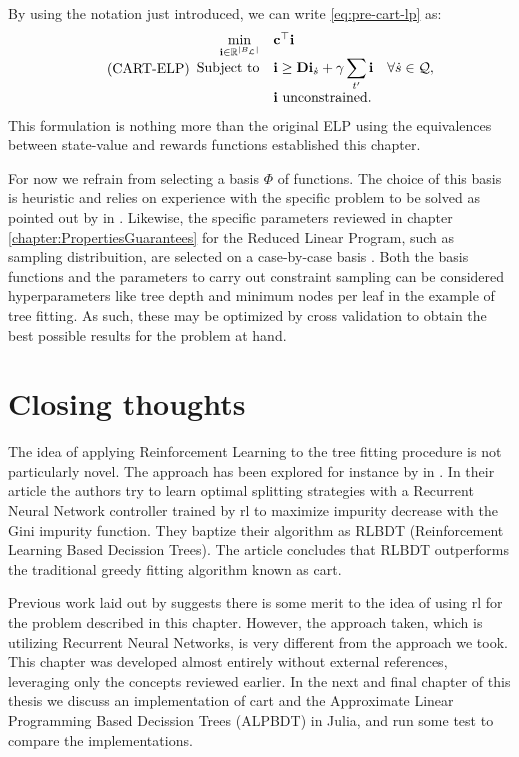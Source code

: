 By using the notation just introduced, we can write \eqref{eq:pre-cart-lp} as:
\begin{equation}
\tag{CART-ELP}
\label{lp:cart-elp}
\begin{array}{rl@{}ll}
    \displaystyle \min_{\vec{i} \in \R^{|B_\L|}} & \vec{c}^{\top} \vec{i} \\
    \text{Subject to} & \displaystyle \vec{i} \geq \vec{Di}_{\dot{s}} + \gamma \sum_{t'} \vec{i} & \quad \forall \dot{s} \in \mathcal{Q}, \\
    & \vec{i} \text{ unconstrained.} &
\end{array}
\end{equation}
This formulation is nothing more than the original ELP using the equivalences between state-value and rewards functions established this chapter.

For now we refrain from selecting a basis $\Phi$ of functions. The choice of
this basis is heuristic and relies on experience with the specific problem to be
solved as pointed out by \citeauthor{farias2003LP2ADP} in
\cite{farias2003LP2ADP}. Likewise, the specific parameters reviewed in chapter
\ref{chapter:PropertiesGuarantees} for the Reduced Linear Program, such as
sampling distribuition, are selected on a case-by-case basis
\cite{farias2004constraint}. Both the basis functions and the parameters to
carry out constraint sampling can be considered hyperparameters like tree depth
and minimum nodes per leaf in the example of tree fitting. As such, these may be
optimized by cross validation \cite[Ch.~2.1]{intro2statslearning} to obtain the
best possible results for the problem at hand.  

\section{Closing thoughts}

The idea of applying Reinforcement Learning to the tree fitting procedure is not
particularly novel. The approach has been explored for instance by
\citeauthor{xiong} in \cite{xiong}. In their article the authors try to learn
optimal splitting strategies with a Recurrent Neural Network controller trained
by \ac{rl} to maximize impurity decrease with the Gini impurity function. They
baptize their algorithm as RLBDT (Reinforcement Learning Based Decission Trees).
The article concludes that RLBDT outperforms the traditional greedy fitting
algorithm known as \ac{cart}.

Previous work laid out by \citeauthor{xiong} suggests there is some merit to the
idea of using \ac{rl} for the problem described in this chapter. However, the
approach taken, which is utilizing Recurrent Neural Networks, is very different
from the approach we took. This chapter was developed almost entirely without
external references, leveraging only the concepts reviewed earlier. In the next
and final chapter of this thesis we discuss an implementation of \ac{cart} and
the Approximate Linear Programming Based Decission Trees (ALPBDT) in Julia, and
run some test to compare the implementations.